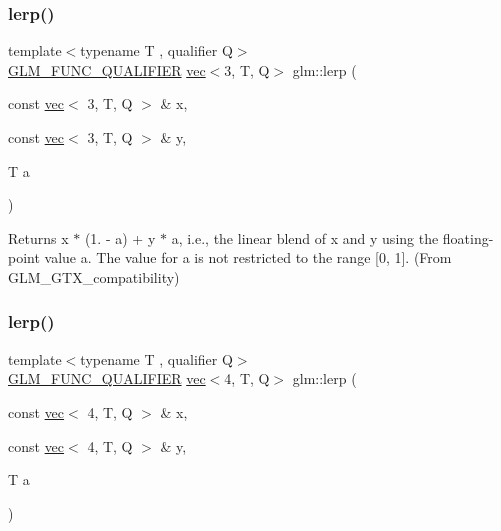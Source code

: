 \subsubsection{\texorpdfstring{lerp()}{lerp()}\hspace{0.1cm}{\footnotesize\ttfamily [3/7]}}
{\footnotesize\ttfamily template$<$typename T , qualifier Q$>$ \\
\hyperlink{setup_8hpp_a33fdea6f91c5f834105f7415e2a64407}{G\+L\+M\+\_\+\+F\+U\+N\+C\+\_\+\+Q\+U\+A\+L\+I\+F\+I\+ER} \hyperlink{structglm_1_1vec}{vec}$<$3, T, Q$>$ glm\+::lerp (\begin{DoxyParamCaption}\item[{const \hyperlink{structglm_1_1vec}{vec}$<$ 3, T, Q $>$ \&}]{x,  }\item[{const \hyperlink{structglm_1_1vec}{vec}$<$ 3, T, Q $>$ \&}]{y,  }\item[{T}]{a }\end{DoxyParamCaption})}



Returns x $\ast$ (1. -\/ a) + y $\ast$ a, i.\+e., the linear blend of x and y using the floating-\/point value a. The value for a is not restricted to the range \mbox{[}0, 1\mbox{]}. (From G\+L\+M\+\_\+\+G\+T\+X\+\_\+compatibility) 

\mbox{\label{group__gtx__compatibility_ga89ac8e000199292ec7875519d27e214b}} 
\subsubsection{\texorpdfstring{lerp()}{lerp()}\hspace{0.1cm}{\footnotesize\ttfamily [4/7]}}
{\footnotesize\ttfamily template$<$typename T , qualifier Q$>$ \\
\hyperlink{setup_8hpp_a33fdea6f91c5f834105f7415e2a64407}{G\+L\+M\+\_\+\+F\+U\+N\+C\+\_\+\+Q\+U\+A\+L\+I\+F\+I\+ER} \hyperlink{structglm_1_1vec}{vec}$<$4, T, Q$>$ glm\+::lerp (\begin{DoxyParamCaption}\item[{const \hyperlink{structglm_1_1vec}{vec}$<$ 4, T, Q $>$ \&}]{x,  }\item[{const \hyperlink{structglm_1_1vec}{vec}$<$ 4, T, Q $>$ \&}]{y,  }\item[{T}]{a }\end{DoxyParamCaption})}



